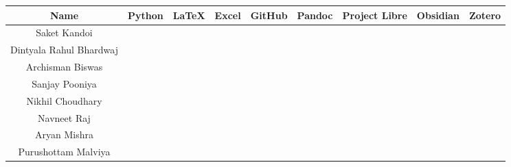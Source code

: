 \begin{center}
\label{table:competency}
\setlength\LTleft{-1.4cm}
\begin{longtable}{|c|c|c|c|c|c|p{1.2cm}|c|c|} \hline
Name                    & Python                   & LaTeX                    & Excel                    & GitHub                   & Pandoc                   & Project Libre            & Obsidian                 & Zotero                   \\ \hline
Saket Kandoi            & \cellcolor[HTML]{00B050} & \cellcolor[HTML]{92D050} & \cellcolor[HTML]{00B050} & \cellcolor[HTML]{00B050} & \cellcolor[HTML]{FFC000} & \cellcolor[HTML]{D9D9D9} & \cellcolor[HTML]{00B050} & \cellcolor[HTML]{FFC000} \\ \hline
Dintyala Rahul Bhardwaj & \cellcolor[HTML]{FFFF00} & \cellcolor[HTML]{00B050} & \cellcolor[HTML]{00B050} & \cellcolor[HTML]{FFFF00} & \cellcolor[HTML]{FFC000} & \cellcolor[HTML]{FFC000} & \cellcolor[HTML]{00B050} & \cellcolor[HTML]{FFC000} \\ \hline
Archisman Biswas        & \cellcolor[HTML]{00B050} & \cellcolor[HTML]{92D050} & \cellcolor[HTML]{92D050} & \cellcolor[HTML]{00B050} & \cellcolor[HTML]{FFFF00} & \cellcolor[HTML]{D9D9D9} & \cellcolor[HTML]{FFC000} & \cellcolor[HTML]{FFC000} \\ \hline
Sanjay Pooniya          & \cellcolor[HTML]{FFFF00} & \cellcolor[HTML]{92D050} & \cellcolor[HTML]{FFFF00} & \cellcolor[HTML]{92D050} & \cellcolor[HTML]{FFC000} & \cellcolor[HTML]{FFC000} & \cellcolor[HTML]{FFC000} & \cellcolor[HTML]{D9D9D9} \\ \hline
Nikhil Choudhary        & \cellcolor[HTML]{FFFF00} & \cellcolor[HTML]{92D050} & \cellcolor[HTML]{FFFF00} & \cellcolor[HTML]{FFFF00} & \cellcolor[HTML]{D9D9D9} & \cellcolor[HTML]{FFFF00} & \cellcolor[HTML]{FFC000} & \cellcolor[HTML]{00B050} \\ \hline
Navneet Raj             & \cellcolor[HTML]{00B050} & \cellcolor[HTML]{FFFF00} & \cellcolor[HTML]{FFFF00} & \cellcolor[HTML]{00B050} & \cellcolor[HTML]{FFFF00} & \cellcolor[HTML]{D9D9D9} & \cellcolor[HTML]{92D050} & \cellcolor[HTML]{D9D9D9} \\ \hline
Aryan Mishra            & \cellcolor[HTML]{92D050} & \cellcolor[HTML]{00B050} & \cellcolor[HTML]{92D050} & \cellcolor[HTML]{FFFF00} & \cellcolor[HTML]{FFFF00} & \cellcolor[HTML]{FFFF00} & \cellcolor[HTML]{00B050} & \cellcolor[HTML]{FFFF00} \\ \hline
Purushottam Malviya     & \cellcolor[HTML]{FFFF00} & \cellcolor[HTML]{FFFF00} & \cellcolor[HTML]{FFFF00} & \cellcolor[HTML]{FFC000} & \cellcolor[HTML]{D9D9D9} & \cellcolor[HTML]{D9D9D9} & \cellcolor[HTML]{D9D9D9} & \cellcolor[HTML]{FFC000} \\ \hline

\end{longtable}
\end{center}
